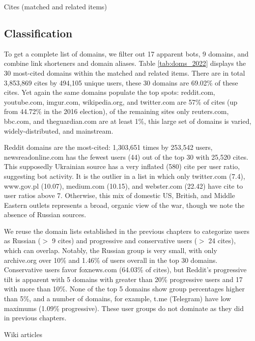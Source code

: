 \documentclass[doublespacing]{utdthesis}
\begin{document}
\begin{table}[!ht]
\centering
\caption{Cites (matched and related items)}

\label{tab:doms_2022}
\end{table}

\subsection{Classification}

To get a complete list of domains, we filter out 17 apparent bots, 9 domains, and combine link shorteners and domain aliases.
Table \ref{tab:doms_2022} displays the 30 most-cited domains within the matched and related items.
There are in total 3,853,869 cites by 494,105 unique users, these 30 domains are 69.02\% of these cites.
Yet again the same domains populate the top spots: reddit.com, youtube.com, imgur.com, wikipedia.org, and twitter.com are 57\% of cites (up from 44.72\% in the 2016 election), of the remaining sites only reuters.com, bbc.com, and theguardian.com are at least 1\%, this large set of domains is varied, widely-distributed, and mainstream.

Reddit domains are the most-cited: 1,303,651 times by 253,542 users, newsreadonline.com has the fewest users (44) out of the top 30 with 25,520 cites.
This supposedly Ukrainian source has a very inflated (580) cite per user ratio, suggesting bot activity.
It is the outlier in a list in which only twitter.com (7.4), www.gov.pl (10.07), medium.com (10.15), and webster.com (22.42) have cite to user ratios above 7.
Otherwise, this mix of domestic US, British, and Middle Eastern outlets represents a broad, organic view of the war, though we note the absence of Russian sources.

We reuse the domain lists established in the previous chapters to categorize users as Russian ($>$ 9 cites) and progressive and conservative users ($>$ 24 cites), which can overlap.
Notably, the Russian group is very small, with only archive.org over 10\% and 1.46\% of users overall in the top 30 domains.
Conservative users favor foxnews.com (64.03\% of cites), but Reddit's progressive tilt is apparent with 5 domains with greater than 20\% progressive users and 17 with more than 10\%.
None of the top 5 domains show group percentages higher than 5\%, and a number of domains, for example, t.me (Telegram) have low maximums (1.09\% progressive).
These user groups do not dominate as they did in previous chapters.

\begin{table}[!ht]
\centering
\caption{Wiki articles}

\label{tab:wiki_2022}
\end{table}
\end{document}

